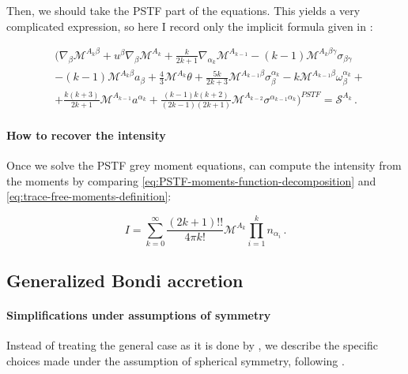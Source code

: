 \documentclass[main.tex]{subfiles}
\begin{document}
Then, we should take the PSTF part of the equations. This yields a very complicated expression, so here I record only the implicit formula given in \textcite[eq. 4.11c]{Thorne:1981feb}:

\begin{equation} \label{eq:PSTF-grey-moment-equations}
  \begin{split}
    &\Bigg( \nabla _\beta \mathscr M ^{A_k \beta} + u^\beta \nabla_\beta \mathscr M ^{A_k}
    + \frac{k}{2k+1} \nabla_{\alpha_k} \mathscr M ^{A_{k-1}}
    - (k-1) \mathscr M ^{A_k \beta \gamma} \sigma_{\beta \gamma} \\
    &- (k-1) \mathscr M ^{A_k \beta} a_\beta
    + \frac{4}{3} \mathscr M ^{A_k} \theta
    + \frac{5k}{2k+3} \mathscr M ^{A_{k-1} \beta} \sigma_\beta^{\alpha_k}
    - k \mathscr M ^{A_{k-1} \beta} \omega_\beta ^{\alpha_k} + \\
    &+ \frac{k (k+3)}{2k+1} \mathscr M ^{A_{k-1}} a^{\alpha_k}
    + \frac{(k-1) k (k+2) }{(2k-1) (2k+1)} \mathscr M ^{A_{k-2}} \sigma^{\alpha_{k-1} \alpha_k} \Bigg)^{PSTF} = \mathscr S ^{A_k} \,.
  \end{split}
\end{equation}

\paragraph{How to recover the intensity}

Once we solve the PSTF grey moment equations, can compute the intensity from the moments by comparing \eqref{eq:PSTF-moments-function-decomposition} and \eqref{eq:trace-free-moments-definition}:

\begin{equation}
  I = \sum _{k=0}   ^{\infty} \frac{(2k+1)!!}{4 \pi k!} \mathscr M^{A_k} \prod_{i=1}^k n_{\alpha_i}\,.
\end{equation}

\subsection{Generalized Bondi accretion}

\paragraph{Simplifications under assumptions of symmetry}

Instead of treating the general case as it is done by \textcite[]{Thorne:1981feb}, we describe the specific choices made under the assumption of spherical symmetry, following \textcite[]{ThorneFLammmangZytkow:1981feb}.
\end{document}
